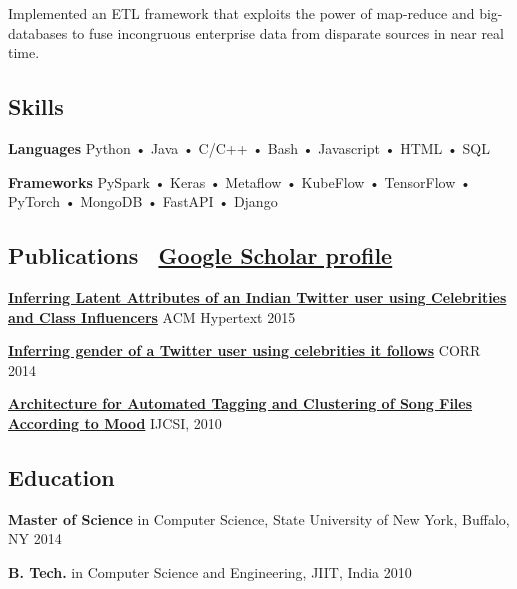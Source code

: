 \documentclass[11pt,letterpaper,sans]{article}
\newcommand{\normalsizesection}{\normalsize}
\newcommand{\smallersection}{\small}
\newcommand{\tinyfootnote}{\fontsize{8.5pt}{8.5pt}\selectfont} %
\newcommand{\sectionbox}[1]{%
    \vspace{0.2em}
    \begin{tcolorbox}[
        colback=sectionbg,
        colframe=sectionbg,
        width=\textwidth,
        left=5pt,
        right=5pt,
        top=2pt,
        bottom=2pt,
        boxrule=0pt,
        arc=0pt,
        boxsep=0pt,
    ]
    \section*{#1}
    \end{tcolorbox}
    \vspace{-0.3em}
}
\newenvironment{projectdesc}{%
    \leftskip=1.0cm
    \footnotesize
    \par\noindent
}{\par\leftskip=0cm\smallersection\vspace{-3pt}}
\newcommand{\iconlink}[3]{%
    #1~\href{#2}{#3}%
}
\begin{document}
\begin{projectdesc}
    Implemented an ETL framework that exploits the power of map-reduce and big-databases to fuse incongruous enterprise data from disparate sources in near real time.
\end{projectdesc}

\normalsizesection

\vspace{30pt} %

\sectionbox{Skills}
\smallersection

\noindent\textbf{Languages} \hspace{2mm} Python • Java • C/C++ • Bash • Javascript • HTML • SQL

\vspace{1pt}
\noindent\textbf{Frameworks} \hspace{0.5mm} PySpark • Keras • Metaflow • KubeFlow • TensorFlow • PyTorch • MongoDB • FastAPI • Django

\normalsizesection

\sectionbox{Publications \hfill \normalsize\iconlink{\faGraduationCap}{https://scholar.google.com/citations?user=NrYKcaMAAAAJ\&hl=en}{Google Scholar profile}}
\tinyfootnote %

\noindent\textbf{\href{http://dl.acm.org/citation.cfm?id=2806657}{Inferring Latent Attributes of an Indian Twitter user using Celebrities and Class Influencers}} \hfill \href{https://www.youtube.com/watch?v=9BtWs3Rn2Ng}{\faYoutube} ACM Hypertext 2015

\vspace{-1pt}
\noindent\textbf{\href{http://arxiv.org/abs/1405.6667}{Inferring gender of a Twitter user using celebrities it follows}} \hfill CORR 2014

\vspace{-1pt}
\noindent\textbf{\href{http://arxiv.org/abs/1206.2484}{Architecture for Automated Tagging and Clustering of Song Files According to Mood}} \hfill IJCSI, 2010

\normalsizesection

\sectionbox{Education}
\smallersection

\noindent\textbf{Master of Science} in Computer Science, State University of New York, Buffalo, NY \hfill 2014

\vspace{-1pt}
\noindent\textbf{B. Tech.} in Computer Science and Engineering, JIIT, India \hfill 2010
\end{document}
